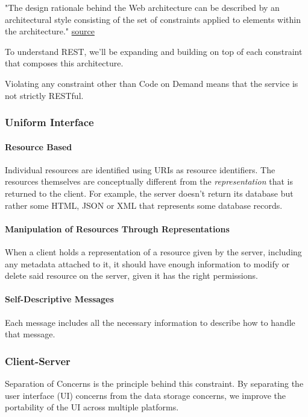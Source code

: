 \documentclass[a4paper]{article}
\begin{document}
    "The design rationale behind the Web architecture can be described by an architectural style consisting of the set of constraints applied to elements within the architecture." \href{https://ics.uci.edu/~fielding/pubs/dissertation/rest_arch_style.htm}{source}

    To understand REST, we'll be expanding and building on top of each constraint that composes this architecture.

    Violating any constraint other than Code on Demand means that the service is not strictly RESTful.

    
    \subsubsection{Uniform Interface}
    \paragraph{Resource Based}
    Individual resources are identified using URIs as resource identifiers. The resources themselves are conceptually different from the \textit{representation} that is returned to the client. For example, the server doesn't return its database but rather some HTML, JSON or XML that represents some database records.

    \paragraph{Manipulation of Resources Through Representations} When a client holds a representation of a resource given by the server, including any metadata attached to it, it should have enough information to modify or delete said resource on the server, given it has the right permissions. 

    \paragraph{Self-Descriptive Messages} Each message includes all the necessary information to describe how to handle that message. 

    
    \subsubsection{Client-Server} Separation of Concerns is the principle behind this constraint. By separating the user interface (UI) concerns from the data storage concerns, we improve the portability of the UI across multiple platforms.
    
\end{document}
